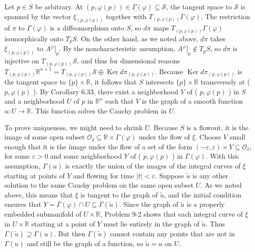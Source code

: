\documentclass[10pt]{article}
\begin{document}
Let $p \in S$ be arbitrary. At $(p, \varphi(p)) \in \Gamma(\varphi) \subseteq \mathcal{S}$, the tangent space to $\mathcal{S}$ is spanned by the vector $\xi_{(p, \varphi(p))}$ together with $T_{(p, \varphi(p))} \Gamma(\varphi)$. The restriction of $\pi$ to $\Gamma(\varphi)$ is a diffeomorphism onto $S$, so $d \pi$ maps $T_{(p, \varphi(p))} \Gamma(\varphi)$ isomorphically onto $T_{p} S$. On the other hand, as we noted above, $d \pi$ takes $\xi_{(p, \varphi(p))}$ to $\left.A^{\varphi}\right|_{p}$. By the noncharacteristic assumption, $\left.A^{\varphi}\right|_{p} \notin T_{p} S$, so $d \pi$ is injective on $T_{(p, \varphi(p))} \mathcal{S}$, and thus for dimensional reasons $T_{(p, \varphi(p))} \mathbb{R}^{n+1}=T_{(p, \varphi(p))} \mathcal{S} \oplus \operatorname{Ker} d \pi_{(p, \varphi(p))}$. Because $\operatorname{Ker} d \pi_{(p, \varphi(p))}$ is the tangent space to $\{p\} \times \mathbb{R}$, it follows that $S$ intersects $\{p\} \times \mathbb{R}$ transversely at ( $p, \varphi(p)$ ). By Corollary 6.33, there exist a neighborhood $V$ of ( $p, \varphi(p)$ ) in $S$ and a neighborhood $U$ of $p$ in $\mathbb{R}^{n}$ such that $V$ is the graph of a smooth function $u: U \rightarrow \mathbb{R}$. This function solves the Cauchy problem in $U$.

To prove uniqueness, we might need to shrink $U$. Because $S$ is a flowout, it is the image of some open subset $\mathcal{O}_{\delta} \subseteq \mathbb{R} \times \Gamma(\varphi)$ under the flow of $\xi$. Choose $V$ small enough that it is the image under the flow of a set of the form $(-\varepsilon, \varepsilon) \times Y \subseteq \mathcal{O}_{\delta}$, for some $\varepsilon>0$ and some neighborhood $Y$ of ( $p, \varphi(p)$ ) in $\Gamma(\varphi)$. With this assumption, $\Gamma(u)$ is exactly the union of the images of the integral curves of $\xi$ starting at points of $Y$ and flowing for time $|t|<\varepsilon$. Suppose $\widetilde{u}$ is any other solution to the same Cauchy problem on the same open subset $U$. As we noted above, this means that $\xi$ is tangent to the graph of $\widetilde{u}$, and the initial condition ensures that $Y=\Gamma(\varphi) \cap U \subseteq \Gamma(\widetilde{u})$. Since the graph of $\tilde{u}$ is a properly embedded submanifold of $U \times \mathbb{R}$, Problem 9-2 shows that each integral curve of $\xi$ in $U \times \mathbb{R}$ starting at a point of $Y$ must lie entirely in the graph of $\widetilde{u}$. Thus $\Gamma(\widetilde{u}) \supseteq \Gamma(u)$. But then $\Gamma(\widetilde{u})$ cannot contain any points that are not in $\Gamma(u)$ and still be the graph of a function, so $\widetilde{u}=u$ on $U$.
\end{document}
